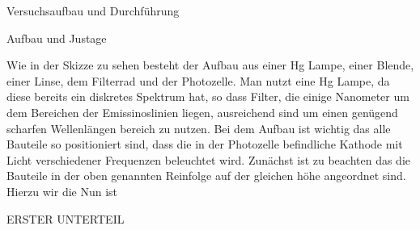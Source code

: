 \documentclass[pdftex, a4paper,11pt, twoside, ngerman]{report}
\begin{document}
  \begin{chapter}{Versuchsaufbau und Durchführung}
    \label{chp:Aufbau}
	
    \begin{section}{Aufbau und Justage}
      \label{chp:Aufbau:sec:ERSTERTEIL}
      
      Wie in der Skizze zu sehen besteht der Aufbau aus einer Hg Lampe, einer Blende, einer Linse, dem Filterrad und der Photozelle. Man nutzt eine Hg Lampe, da diese bereits ein diskretes Spektrum hat, so dass Filter, die einige Nanometer um dem Bereichen der Emissinoslinien liegen, ausreichend sind um einen genügend scharfen Wellenlängen bereich zu nutzen. 
      Bei dem Aufbau ist wichtig das alle Bauteile so positioniert sind, dass die in der Photozelle befindliche Kathode mit Licht verschiedener Frequenzen beleuchtet wird. Zunächst ist zu beachten das die Bauteile in der oben genannten Reinfolge auf der gleichen höhe angeordnet sind.
      Hierzu wir die 
      Nun ist
      
      \begin{subsection}{ERSTER UNTERTEIL}
	\label{chp:Aufbau:sec:ERSTERTEIL:subsec:UNTERTEIL}
       
       
       
      \end{subsection}
      
      
    \end{section}
    
  \end{chapter}
  
\end{document}
